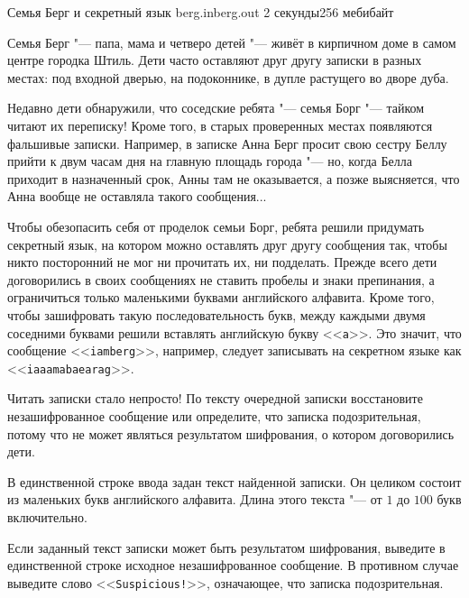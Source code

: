 \gdef\thisproblemauthor{Иван Казменко}
\gdef\thisproblemdeveloper{Иван Казменко}
\begin{problem}{Семья Берг и секретный язык}
{berg.in}{berg.out}
{2 секунды}{256 мебибайт}{}

Семья Берг "--- папа, мама и четверо детей "--- живёт в кирпичном доме
в самом центре городка Штиль.
Дети часто оставляют друг другу записки в разных местах:
под входной дверью, на подоконнике, в дупле растущего во дворе дуба.

Недавно дети обнаружили, что соседские ребята "--- семья Борг "--- тайком
читают их переписку!
Кроме того, в старых проверенных местах появляются фальшивые записки.
Например, в записке Анна Берг просит свою сестру Беллу прийти к двум
часам дня на главную площадь города "--- но, когда Белла приходит
в назначенный срок, Анны там не оказывается, а позже выясняется,
что Анна вообще не оставляла такого сообщения...

Чтобы обезопасить себя от проделок семьи Борг, ребята решили придумать
секретный язык, на котором можно оставлять друг другу сообщения так,
чтобы никто посторонний не мог ни прочитать их, ни подделать.
Прежде всего дети договорились в своих сообщениях не ставить пробелы
и знаки препинания, а ограничиться только маленькими буквами
английского алфавита.
Кроме того, чтобы зашифровать такую последовательность букв, между каждыми
двумя соседними буквами решили вставлять английскую букву <<\texttt{a}>>.
Это значит, что сообщение <<\texttt{iamberg}>>, например, следует записывать
на секретном языке как <<\texttt{iaaamabaearag}>>.

Читать записки стало непросто!
По тексту очередной записки восстановите незашифрованное сообщение
или определите, что записка подозрительная, потому что не может являться
результатом шифрования, о котором договорились дети.

\ifdefined\newpageafterlegend\newpage\fi

\InputFile

В единственной строке ввода задан текст найденной записки.
Он целиком состоит из маленьких букв английского алфавита.
Длина этого текста "--- от $1$ до $100$ букв включительно.

\OutputFile

Если заданный текст записки может быть результатом шифрования,
выведите в единственной строке исходное незашифрованное сообщение.
В противном случае выведите слово <<\texttt{Suspicious!}>>, означающее,
что записка подозрительная.


\end{problem}
